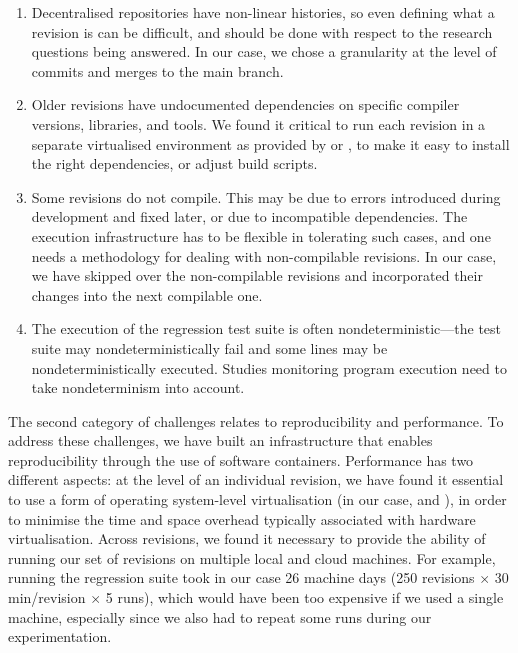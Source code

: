 \begin{enumerate}
\item Decentralised repositories have non-linear histories, so even
  defining what a revision is can be difficult, and should be done
  with respect to the research questions being answered.  In our case,
  we chose a granularity at the level of commits and merges to the
  main branch.

\item Older revisions have undocumented dependencies on specific
  compiler versions, libraries, and tools.  We found it critical to run each
  revision in a separate virtualised environment as provided by \lxc or
  \docker, to make it easy to install the right dependencies, or adjust build
  scripts.

\item Some revisions do not compile.  This may be due to errors
  introduced during development and fixed later, or due to incompatible
  dependencies. The execution infrastructure has to be
  flexible in tolerating such cases, and one needs a methodology for
  dealing with non-compilable revisions.  In our case, we have skipped
  over the non-compilable revisions and incorporated their changes into
  the next compilable one.

\item The execution of the regression test suite is often
  nondeterministic---the test suite may nondeterministically fail
  and some lines may be nondeterministically executed. Studies
  monitoring program execution need to take nondeterminism
  into account.
\end{enumerate}

The second category of challenges relates to reproducibility and performance.
To address these challenges, we have built an infrastructure that enables
reproducibility through the use of software containers. Performance has two
different aspects: at the level of an individual revision, we have found it
essential to use a form of operating system-level virtualisation (in our case,
\lxc and \docker), in order to minimise the time and space overhead typically
associated with hardware virtualisation.  Across revisions, we found it
necessary to provide the ability of running our set of revisions on multiple
local and cloud machines. For example, running the \git regression suite took
in our case 26 machine days (250 revisions $\times$ 30 min/revision $\times$ 5
runs), which would have been too expensive if we used a single machine,
especially since we also had to repeat some runs during our experimentation.
